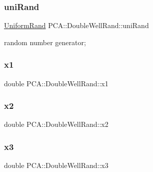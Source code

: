 \subsubsection{\texorpdfstring{uni\+Rand}{uniRand}}
{\footnotesize\ttfamily \hyperlink{class_p_c_a_1_1_uniform_rand}{Uniform\+Rand} P\+C\+A\+::\+Double\+Well\+Rand\+::uni\+Rand\hspace{0.3cm}{\ttfamily [private]}}



random number generator; 

\hypertarget{class_p_c_a_1_1_double_well_rand_ab624775bcfb6b575ae1aa099bcd78cd7}{}\label{class_p_c_a_1_1_double_well_rand_ab624775bcfb6b575ae1aa099bcd78cd7} 
\subsubsection{\texorpdfstring{x1}{x1}}
{\footnotesize\ttfamily double P\+C\+A\+::\+Double\+Well\+Rand\+::x1\hspace{0.3cm}{\ttfamily [private]}}

\hypertarget{class_p_c_a_1_1_double_well_rand_a116879814f1ddd7bfc1efc3c11bf8c5b}{}\label{class_p_c_a_1_1_double_well_rand_a116879814f1ddd7bfc1efc3c11bf8c5b} 
\subsubsection{\texorpdfstring{x2}{x2}}
{\footnotesize\ttfamily double P\+C\+A\+::\+Double\+Well\+Rand\+::x2\hspace{0.3cm}{\ttfamily [private]}}

\hypertarget{class_p_c_a_1_1_double_well_rand_a2ac7d1cea509a918639ccb8bef3f1d0a}{}\label{class_p_c_a_1_1_double_well_rand_a2ac7d1cea509a918639ccb8bef3f1d0a} 
\subsubsection{\texorpdfstring{x3}{x3}}
{\footnotesize\ttfamily double P\+C\+A\+::\+Double\+Well\+Rand\+::x3\hspace{0.3cm}{\ttfamily [private]}}

